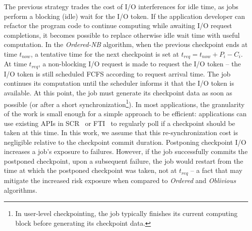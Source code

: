\documentclass[conference,nofonttune]{IEEEtran}
\newcommand{\eg}[0]{\emph{e.g.}\xspace}
\newcommand{\period}[1]{P_{#1}}
\newcommand{\ckpt}[1]{C_{#1}}
\newcommand{\dca}[1]{\todo[inline]{DCA: #1}}
\newcommand{\nocoop}{\emph{Oblivious}\xspace}
\newcommand{\fifoblock}{\emph{Ordered}\xspace}
\newcommand{\fifononblock}{\emph{Ordered-NB}\xspace}
\begin{document}
The previous strategy trades the cost of I/O interferences for idle time, as
jobs perform a blocking (idle) wait for the I/O token.  If the application
developer can refactor the program code to continue computing while awaiting
I/O request completions, it becomes possible to replace otherwise idle wait
time with useful computation. In the \fifononblock algorithm, when the previous
checkpoint ends at time $t_{now}$, a tentative time for the next checkpoint is
set at $t_{req}=t_{now}+\period{i}-\ckpt{i}$.  At time $t_{req}$, a
non-blocking I/O request is made to request the I/O token -- the I/O token is
still scheduled FCFS according to request arrival time.  The job continues its
computation until the scheduler informs it that the I/O token is available. At
this point, the job must generate its checkpoint data as soon as possible (or
after a short synchronization\footnote{In user-level checkpointing, the job
typically finishes its current computing block before generating its checkpoint
data.}).  In most applications, the granularity of the work is small enough for
a simple approach to be efficient: applications can use existing APIs in
SCR~\cite{Moody10SCR} or FTI~\cite{Bautista-Gomez11_FTI} to regularly poll if a
checkpoint should be taken at this time. In this work, we assume that this
re-synchronization cost is negligible relative to the checkpoint commit
duration.
%
%
Postponing checkpoint I/O increases a job's exposure to failures.  However,
if the job successfully commits the postponed checkpoint, upon a subsequent failure,
the job would restart from the time at which the postponed checkpoint was taken, not
at $t_{req}$ -- a fact that may mitigate the increased risk exposure when
compared to \fifoblock and \nocoop algorithms.


\end{document}
